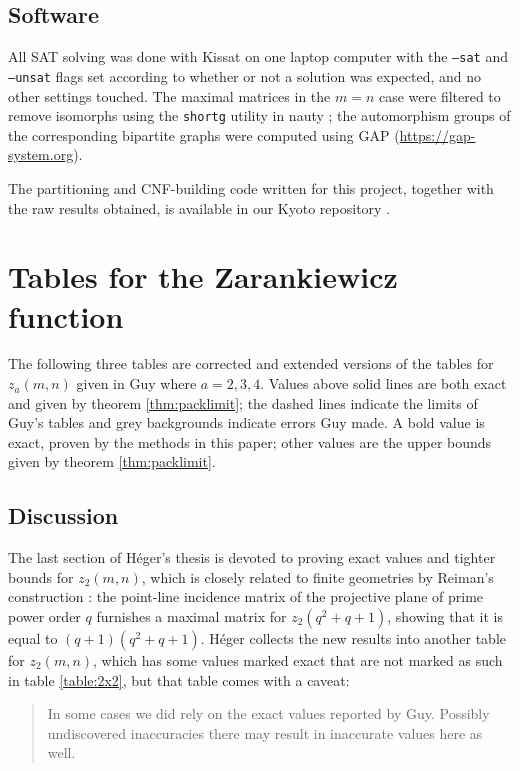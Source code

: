 \documentclass[10pt,a4paper]{article}
\theoremstyle{definition}
\begin{document}
	\subsection{Software}
	
	All SAT solving was done with Kissat \cite{kissat} on one laptop computer with the \texttt{--sat} and \texttt{--unsat} flags set according to whether or not a solution was expected, and no other settings touched. The maximal matrices in the $m=n$ case were filtered to remove isomorphs using the \texttt{shortg} utility in nauty \cite{nauty}; the automorphism groups of the corresponding bipartite graphs were computed using GAP (\url{https://gap-system.org}).
	
	The partitioning and CNF-building code written for this project, together with the raw results obtained, is available in our Kyoto repository \cite{kyoto}.
	
	\section{Tables for the Zarankiewicz function}\label{sec:tables}
	
	The following three tables are corrected and extended versions of the tables for $z_a(m,n)$ given in Guy \cite{guy} where $a=2,3,4$. Values above solid lines are both exact and given by theorem \ref{thm:packlimit}; the dashed lines indicate the limits of Guy's tables and grey backgrounds indicate errors Guy made. A bold value is exact, proven by the methods in this paper; other values are the upper bounds given by theorem \ref{thm:packlimit}.
	
	\subsection{Discussion}
	
	The last section of Héger's thesis \cite{heger} is devoted to proving exact values and tighter bounds for $z_2(m,n)$, which is closely related to finite geometries by Reiman's construction \cite{reiman}: the point-line incidence matrix of the projective plane of prime power order $q$ furnishes a maximal matrix for $z_2(q^2+q+1)$, showing that it is equal to $(q+1)(q^2+q+1)$. Héger collects the new results into another table for $z_2(m,n)$, which has some values marked exact that are not marked as such in table \ref{table:2x2}, but that table comes with a caveat:
	\begin{quotation}
		In some cases we did rely on the exact values reported by Guy. Possibly undiscovered inaccuracies there may result in inaccurate values here as well.
	\end{quotation}
	
\end{document}
